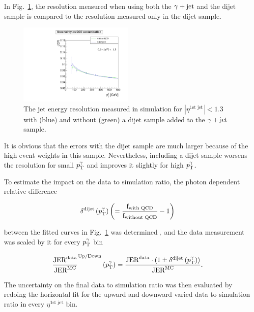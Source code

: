 In \mbox{Fig. \ref{fig:QCDuncertainty}}, the resolution measured when using both the $\gamma + \text{jet}$ and the dijet sample is compared to the resolution measured only in the dijet sample.
\begin{figure}[b]
  \centering

      \includegraphics[width=0.50\textwidth]{figures/resolution/systematicUncertainties/Resolution_for_1_eta_bin_QCDUncertainty_RMS99.pdf}
 
  \caption{The jet energy resolution measured in simulation for $|\eta^{\text{1st jet}}| < 1.3$ with (blue) and without (green) a dijet sample added to the $\gamma + \text{jet}$ sample.}  
  \label{fig:QCDuncertainty}
\end{figure}
It is obvious that the errors with the dijet sample are much larger because of the high event weights in this sample. 
Nevertheless, including a dijet sample worsens the resolution for small $p_{\text{T}}^{\gamma}$ and improves it slightly for high $p_{\text{T}}^{\gamma}$.

To estimate the impact on the data to simulation ratio, 
the photon \pt dependent  relative difference 

\begin{equation}
\label{eq:dijetUnc1}
\delta^{\text{dijet}} \left( p_{\text{T}}^{\gamma} \right) \left(= \frac{\text{f}_{\text{with QCD}}}{\text{f}_{\text{without QCD}}} - 1 \right)
\end{equation}
 
between the fitted curves in \mbox{Fig. \ref{fig:QCDuncertainty}}
was determined  , and the data measurement was scaled by it for every $p_{\text{T}}^{\gamma}$ bin 

\begin{equation}
\label{eq:dijetUnc}
\frac{\text{JER}^{\text{data}}}{\text{JER}^{\text{MC}}}^{\text{Up/Down}} \left( p_{\text{T}}^{\gamma}   \right) = \frac{\text{JER}^{\text{data}} 
\cdot (1 \pm \delta^{\text{dijet}}\left( p_{\text{T}}^{\gamma} \right))}{\text{JER}^{\text{MC}}}. 
\end{equation}

The uncertainty on the final data to simulation ratio was then evaluated by redoing the horizontal fit for the upward and downward varied data to simulation ratio 
in every $\eta^{\text{1st jet}}$ bin.

